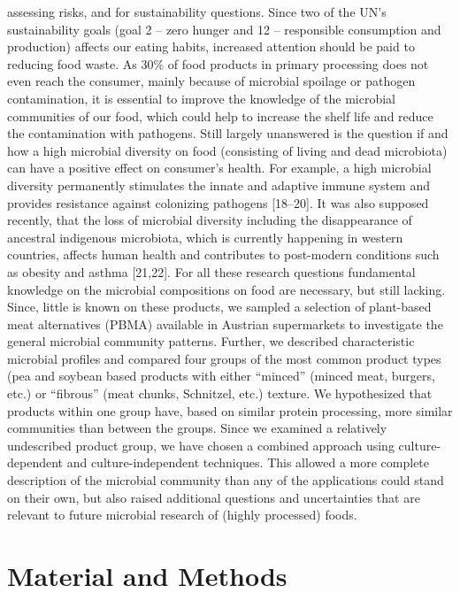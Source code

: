 \documentclass[preprint,3p,
a4paper]{elsarticle} %
\begin{document}
assessing risks, and for sustainability questions. Since two of the UN's
sustainability goals (goal 2 -- zero hunger and 12 -- responsible
consumption and production) affects our eating habits, increased
attention should be paid to reducing food waste. As 30\% of food
products in primary processing does not even reach the consumer, mainly
because of microbial spoilage or pathogen contamination, it is essential
to improve the knowledge of the microbial communities of our food, which
could help to increase the shelf life and reduce the contamination with
pathogens. Still largely unanswered is the question if and how a high
microbial diversity on food (consisting of living and dead microbiota)
can have a positive effect on consumer's health. For example, a high
microbial diversity permanently stimulates the innate and adaptive
immune system and provides resistance against colonizing pathogens
{[}18--20{]}. It was also supposed recently, that the loss of microbial
diversity including the disappearance of ancestral indigenous
microbiota, which is currently happening in western countries, affects
human health and contributes to post-modern conditions such as obesity
and asthma {[}21,22{]}. For all these research questions fundamental
knowledge on the microbial compositions on food are necessary, but still
lacking. Since, little is known on these products, we sampled a
selection of plant-based meat alternatives (PBMA) available in Austrian
supermarkets to investigate the general microbial community patterns.
Further, we described characteristic microbial profiles and compared
four groups of the most common product types (pea and soybean based
products with either ``minced'' (minced meat, burgers, etc.) or
``fibrous'' (meat chunks, Schnitzel, etc.) texture. We hypothesized that
products within one group have, based on similar protein processing,
more similar communities than between the groups. Since we examined a
relatively undescribed product group, we have chosen a combined approach
using culture-dependent and culture-independent techniques. This allowed
a more complete description of the microbial community than any of the
applications could stand on their own, but also raised additional
questions and uncertainties that are relevant to future microbial
research of (highly processed) foods.

\hypertarget{material-and-methods}{%
\section{Material and Methods}\label{material-and-methods}}
\end{document}
